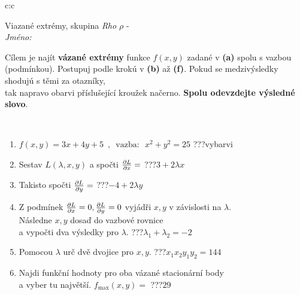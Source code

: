 \documentclass[10pt]{report}
\begin{document}
\begin{tabular}{c:c}
\begin{minipage}[c][104.5mm][t]{0.5\linewidth}
\begin{center}
\vspace{7mm}
{\huge Viazané extrémy, skupina \textit{Rho $\rho$} -}\\[5mm]
\textit{Jméno:}\phantom{xxxxxxxxxxxxxxxxxxxxxxxxxxxxxxxxxxxxxxxxxxxxxxxxxxxxxxxxxxxxxxxxx}\\[5mm]
\begin{minipage}{0.95\linewidth}
\begin{center}
Cílem je najít \textbf{vázané extrémy} funkce $f(x,y)$ zadané v \textbf{(a)} spolu s vazbou (podmínkou). Postupuj podle krokú v \textbf{(b)} až \textbf{(f)}. Pokud se medzivýsledky shodujú s těmi za otazníky,\\tak napravo obarvi příslušející kroužek načerno. \textbf{Spolu odevzdejte výsledné slovo}.
\end{center}
\end{minipage}
\\[1mm]
\begin{minipage}{0.79\linewidth}
\begin{center}
\begin{varwidth}{\linewidth}
\begin{enumerate}
\normalsize
\item $f(x,y)=3x+4y+5 \enspace , \enspace \mathrm{vazba:} \enspace x^2+y^2=25$\quad \dotfill\; ???\;\dotfill \quad vybarvi
\item Sestav $L(\lambda,x,y)$ a spočti $\pdv{L}{x}=$\quad \dotfill\; ???\;\dotfill \quad $3+2\lambda x$
\item Takisto spočti $\pdv{L}{y}=$\quad \dotfill\; ???\;\dotfill \quad $-4+2\lambda y$
\item Z podmínek $\pdv{L}{x}=0 , \pdv{L}{y}=0$ vyjádři $x,y$ v závislosti na $\lambda$.\\ \phantom{xxxxxx}Následne $x,y$ dosaď do vazbové rovnice\\ \phantom{xxxxxx}a vypočti dva výsledky pro $\lambda$.\quad \dotfill\; ???\;\dotfill \quad $\lambda_1+\lambda_2=-2$
\item Pomocou $\lambda$ urč dvě dvojice pro $x,y$.\quad \dotfill\; ???\;\dotfill \quad $x_1 x_2 y_1 y_2=144$
\item Najdi funkční hodnoty pro oba vázané stacionární body\\ \phantom{xxxxxx}a vyber tu najvětší. $f_{\text{max}}(x,y)=$\quad \dotfill\; ???\;\dotfill \quad $29$

\end{enumerate}
\end{varwidth}
\end{center}
\end{minipage}
\end{center}
\end{minipage}
\end{tabular}
\end{document}

